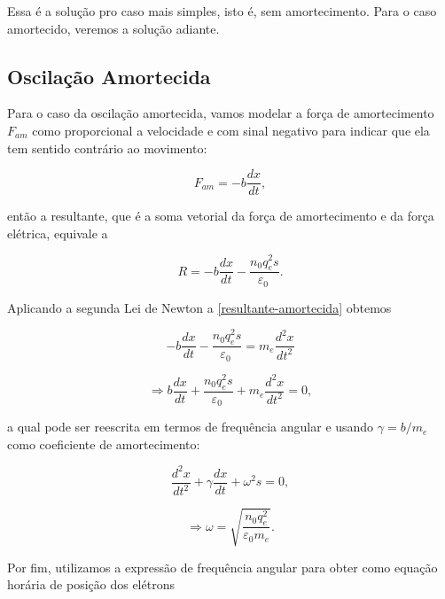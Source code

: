 \documentclass[
	article,
	11pt,
	oneside,
	a4paper,
	english,
	brazil,
	sumario=tradicional
	]{abntex2}
\begin{document}
\noindent Essa é a solução pro caso mais simples, isto é, sem amortecimento. Para o caso amortecido, veremos a solução adiante.

\subsection{Oscilação Amortecida}

Para o caso da oscilação amortecida, vamos modelar a força de amortecimento $F_{am}$ como proporcional a velocidade e com sinal negativo para indicar que ela tem sentido contrário ao movimento:

\begin{equation} \label{forca-amortecimento}
  F_{am} = -b\frac{dx}{dt},
\end{equation}

\noindent então a resultante, que é a soma vetorial da força de amortecimento e da força elétrica, equivale a

\begin{equation} \label{resultante-amortecida}
  R = -b\frac{dx}{dt} - \frac{n_0 q_e^2 s}{\varepsilon _0~}.
\end{equation}

\noindent Aplicando a segunda Lei de Newton a \ref{resultante-amortecida} obtemos

\begin{equation}
  -b\frac{dx}{dt} - \frac{n_0 q_e^2 s}{\varepsilon _0~} = m_e\frac{d^2x}{dt^2}
\end{equation}

\begin{equation}
  \Rightarrow b\frac{dx}{dt} + \frac{n_0 q_e^2 s}{\varepsilon _0~} + m_e\frac{d^2x}{dt^2} = 0,
\end{equation}

\noindent a qual pode ser reescrita em termos de frequência angular e usando $\gamma = b/m_e$ como coeficiente de amortecimento:

\begin{equation} \label{equacao-diferencial-omega}
  \frac{d^2x}{dt^2}  + \gamma\frac{dx}{dt} + \omega^2 s= 0,
\end{equation}

\begin{equation}
  \Rightarrow \omega=\sqrt{\frac{n_0 q_e^2}{\varepsilon_0 m_e}}.
\end{equation}

\noindent Por fim, utilizamos a expressão de frequência angular para obter como equação horária de posição dos elétrons
\end{document}
